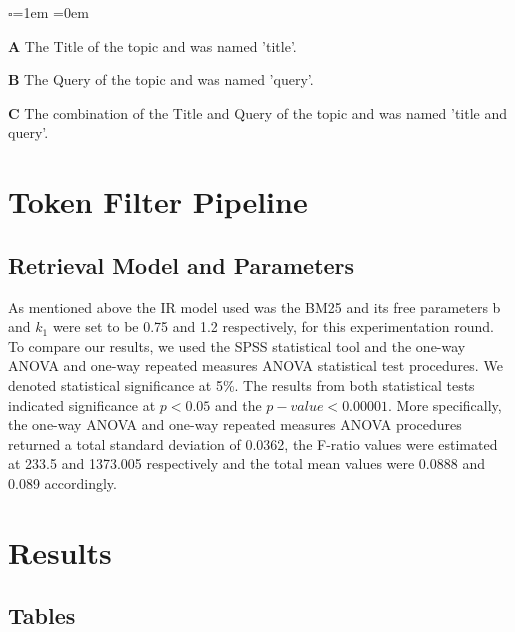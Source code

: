 \begin{list}{$\square$}{\leftmargin=1em \itemindent=0em}
	\item[\textbf{A}] The Title of the topic and was named 'title'.
    \item[\textbf{B}] The Query of the topic and was named 'query'.
    \item[\textbf{C}] The combination of the Title and Query of the topic and was named 'title and query'.
\end{list}

\section{Token Filter Pipeline}

\subsection{Retrieval Model and Parameters}

As mentioned above the IR model used was the BM25 and its free parameters b and $k_1$ were set to be 0.75 and 1.2 respectively, for this experimentation round. To compare our results, we used the SPSS statistical tool and the one-way ANOVA and one-way repeated measures ANOVA statistical test procedures. We denoted statistical significance at 5\%. The results from both statistical tests indicated significance at $p < 0.05$ and the $p-value < 0.00001$. More specifically, the one-way ANOVA and one-way repeated measures ANOVA procedures returned a total standard deviation of 0.0362, the F-ratio values were estimated at 233.5 and 1373.005 respectively and the total mean values were 0.0888 and 0.089 accordingly.

\section{Results}

\subsection{Tables}

